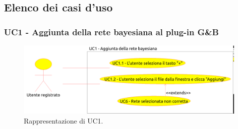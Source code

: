 \subsection{Elenco dei casi d'uso}


\subsubsection{UC1 - Aggiunta della rete bayesiana al plug-in G\&B}\label{UC1}

\begin{figure}[h!]
	\begin{center}
		\includegraphics[scale=0.5]{./images/UC1.png}
		 \caption{Rappresentazione di UC1.}	
	\end{center}
\end{figure}


